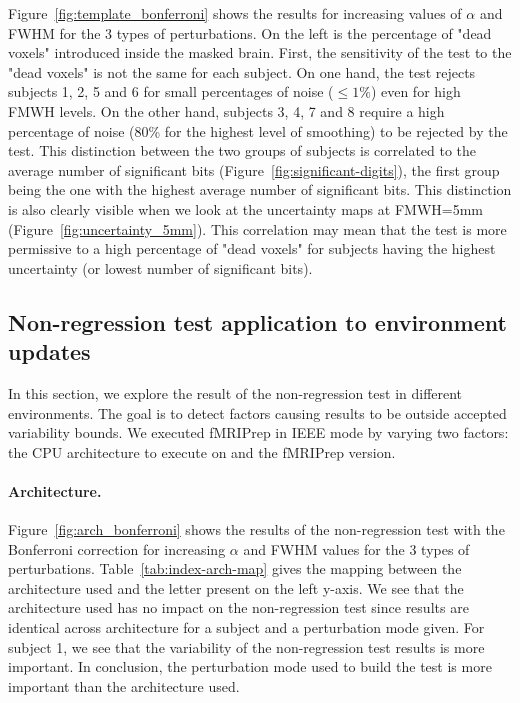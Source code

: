 \documentclass{article}
\newcommand{\fmriprep}{fMRIPrep\xspace}
\begin{document}
Figure~\ref{fig:template_bonferroni} shows the results for increasing values of $\alpha$ and FWHM for the 3 types of perturbations. On the left is the percentage of "dead voxels" introduced inside the masked brain. First, the sensitivity of the test to the "dead voxels" is not the same for each subject. On one hand, the test rejects subjects 1, 2, 5 and 6 for small percentages of noise ($\leq 1\%$) even for high FMWH levels. On the other hand, subjects 3, 4, 7 and 8 require a high percentage of noise (80\% for the highest level of smoothing) to be rejected by the test. This distinction between the two groups of subjects is correlated to the average number of significant bits (Figure~\ref{fig:significant-digits}), the first group being the one with the highest average number of significant bits. This distinction is also clearly visible when we look at the uncertainty maps at FMWH=5mm (Figure~\ref{fig:uncertainty_5mm}). This correlation may mean that the test is more permissive to a high percentage of "dead voxels" for subjects having the highest uncertainty (or lowest number of significant bits).

\subsection{Non-regression test application to environment updates}

In this section, we explore the result of the non-regression test in different environments. The goal is to detect factors causing results to be outside accepted variability bounds. We executed \fmriprep in IEEE mode by varying two factors: the CPU architecture to execute on and the \fmriprep version.

\paragraph*{Architecture.} Figure~\ref{fig:arch_bonferroni} shows the results of the non-regression test with the Bonferroni correction for increasing $\alpha$ and FWHM values for the 3 types of perturbations. Table~\ref{tab:index-arch-map} gives the mapping between the architecture used and the letter present on the left y-axis. We see that the architecture used has no impact on the non-regression test since results are identical across architecture for a subject and a perturbation mode given. For subject 1, we see that the variability of the non-regression test results is more important. In conclusion, the perturbation mode used to build the test is more important than the architecture used.
\end{document}
